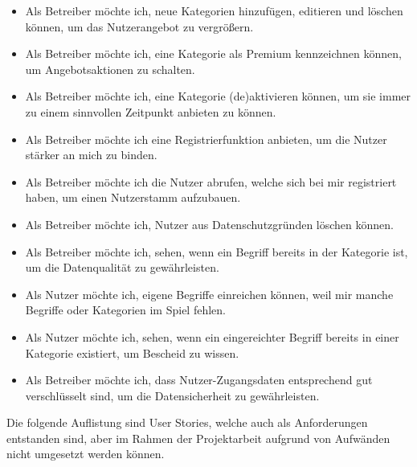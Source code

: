 {\begin{itemize}
	\item Als Betreiber möchte ich, neue Kategorien hinzufügen, editieren und löschen können, um das Nutzerangebot zu vergrößern.
	\item Als Betreiber möchte ich, eine Kategorie als Premium kennzeichnen können, um Angebotsaktionen zu schalten.
	\item Als Betreiber möchte ich, eine Kategorie (de)aktivieren können, um sie immer zu einem sinnvollen Zeitpunkt anbieten zu können.
	\item Als Betreiber möchte ich eine Registrierfunktion anbieten, um die Nutzer stärker an mich zu binden.
	\item Als Betreiber möchte ich die Nutzer abrufen, welche sich bei mir registriert haben, um einen Nutzerstamm aufzubauen.
	\item Als Betreiber möchte ich, Nutzer aus Datenschutzgründen löschen können.
	\item Als Betreiber möchte ich, sehen, wenn ein Begriff bereits in der Kategorie ist, um die Datenqualität zu gewährleisten.
	\item Als Nutzer möchte ich, eigene Begriffe einreichen können, weil mir manche Begriffe oder Kategorien im Spiel fehlen.
	\item Als Nutzer möchte ich, sehen, wenn ein eingereichter Begriff bereits in einer Kategorie existiert, um Bescheid zu wissen.	
	\item Als Betreiber möchte ich, dass Nutzer-Zugangsdaten entsprechend gut verschlüsselt sind, um die Datensicherheit zu gewährleisten.
\end{itemize}

Die folgende Auflistung sind User Stories, welche auch als Anforderungen entstanden sind, aber im Rahmen der Projektarbeit aufgrund von Aufwänden nicht umgesetzt werden können.

}
